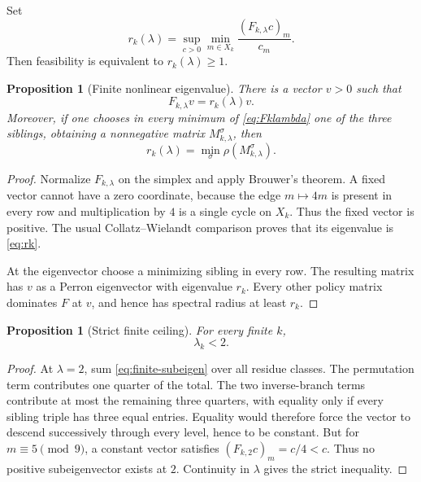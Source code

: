 \documentclass[11pt]{amsart}
\numberwithin{equation}{section}
\newtheorem{proposition}[theorem]{Proposition}
\begin{document}
Set
\begin{equation}\label{eq:rk}
r_k(\lambda)
=
\sup_{c>0}
\min_{m\in X_k}
\frac{(F_{k,\lambda}c)_m}{c_m}.
\end{equation}
Then feasibility is equivalent to $r_k(\lambda)\ge1$.

\begin{proposition}[Finite nonlinear eigenvalue]\label{prop:finite-eigen}
There is a vector $v>0$ such that
\[
F_{k,\lambda}v=r_k(\lambda)v.
\]
Moreover, if one chooses in every minimum of \eqref{eq:Fklambda} one of the three siblings, obtaining a nonnegative matrix $M^\sigma_{k,\lambda}$, then
\begin{equation}\label{eq:robust-radius}
r_k(\lambda)=\min_\sigma\rho(M^\sigma_{k,\lambda}).
\end{equation}
\end{proposition}

\begin{proof}
Normalize $F_{k,\lambda}$ on the simplex and apply Brouwer's theorem.  A fixed vector cannot have a zero coordinate, because the edge $m\mapsto4m$ is present in every row and multiplication by $4$ is a single cycle on $X_k$.  Thus the fixed vector is positive.  The usual Collatz--Wielandt comparison proves that its eigenvalue is \eqref{eq:rk}.

At the eigenvector choose a minimizing sibling in every row.  The resulting matrix has $v$ as a Perron eigenvector with eigenvalue $r_k$.  Every other policy matrix dominates $F$ at $v$, and hence has spectral radius at least $r_k$.
\end{proof}

\begin{proposition}[Strict finite ceiling]\label{prop:lambda-k-less-2}
For every finite $k$,
\[
\lambda_k<2.
\]
\end{proposition}

\begin{proof}
At $\lambda=2$, sum \eqref{eq:finite-subeigen} over all residue classes.  The permutation term contributes one quarter of the total.  The two inverse-branch terms contribute at most the remaining three quarters, with equality only if every sibling triple has three equal entries.  Equality would therefore force the vector to descend successively through every level, hence to be constant.  But for $m\equiv5\pmod9$, a constant vector satisfies $(F_{k,2}c)_m=c/4<c$.  Thus no positive subeigenvector exists at $2$.  Continuity in $\lambda$ gives the strict inequality.
\end{proof}
\end{document}
